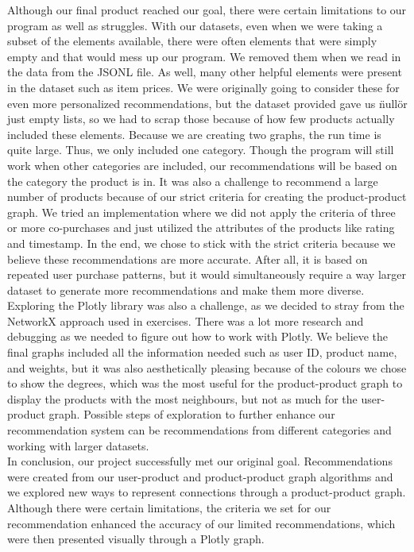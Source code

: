 \documentclass[fontsize=11pt]{article}
\begin{document}
Although our final product reached our goal, there were certain limitations to our program as well as struggles. With our datasets, even when we were taking a subset of the elements available, there were often elements that were simply empty and that would mess up our program. We removed them when we read in the data from the JSONL file. As well, many other helpful elements were present in the dataset such as item prices. We were originally going to consider these for even more personalized recommendations, but the dataset provided gave us \"null\" or just empty lists, so we had to scrap those because of how few products actually included these elements. Because we are creating two graphs, the run time is quite large. Thus, we only included one category. Though the program will still work when other categories are included, our recommendations will be based on the category the product is in. It was also a challenge to recommend a large number of products because of our strict criteria for creating the product-product graph. We tried an implementation where we did not apply the criteria of three or more co-purchases and just utilized the attributes of the products like rating and timestamp. In the end, we chose to stick with the strict criteria because we believe these recommendations are more accurate. After all, it is based on repeated user purchase patterns, but it would simultaneously require a way larger dataset to generate more recommendations and make them more diverse. Exploring the Plotly library was also a challenge, as we decided to stray from the NetworkX approach used in exercises. There was a lot more research and debugging as we needed to figure out how to work with Plotly. We believe the final graphs included all the information needed such as user ID, product name, and weights, but it was also aesthetically pleasing because of the colours we chose to show the degrees, which was the most useful for the product-product graph to display the products with the most neighbours, but not as much for the user-product graph. Possible steps of exploration to further enhance our recommendation system can be recommendations from different categories and working with larger datasets. \\

In conclusion, our project successfully met our original goal. Recommendations were created from our user-product and product-product graph algorithms and we explored new ways to represent connections through a product-product graph. Although there were certain limitations, the criteria we set for our recommendation enhanced the accuracy of our limited recommendations, which were then presented visually through a Plotly graph. 
\end{document}

